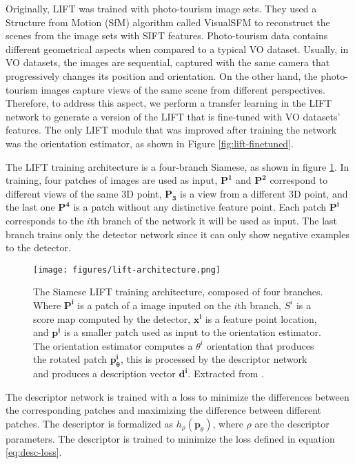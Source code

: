 Originally, LIFT was trained with photo-tourism image sets. They used a Structure from Motion (SfM) algorithm called VisualSFM \cite{visual-sfm} to reconstruct the scenes from the image sets with SIFT features. Photo-tourism data contains different geometrical aspects when compared to a typical VO dataset. Usually, in VO datasets, the images are sequential, captured with the same camera that progressively changes its position and orientation. On the other hand, the photo-tourism images capture views of the same scene from different perspectives. Therefore, to address this aspect, we perform a transfer learning in the LIFT network to generate a version of the LIFT that is fine-tuned with VO datasets' features. The only LIFT module that was improved after training the network was the orientation estimator, as shown in Figure \ref{fig:lift-finetuned}. 

The LIFT training architecture is a four-branch Siamese, as shown in figure \ref{fig:lift-architecture}. In training, four patches of images are used as input, $\mathbf{P^1}$ and $\mathbf{P^2}$ correspond to different views of the same 3D point, $\mathbf{P_3}$ is a view from a different 3D point, and the last one $\mathbf{P^4}$ is a patch without any distinctive feature point. Each patch $\mathbf{P^i}$ corresponds to the $i$th branch of the network it will be used as input. The last branch trains only the detector network since it can only show negative examples to the detector.

\begin{figure}
\centerline{\texttt{[image: figures/lift-architecture.png]}}
\caption[Siamese LIFT training architecture.]{The Siamese LIFT training architecture, composed of four branches. Where $\mathbf{P^i}$ is a patch of a image inputed on the $i$th branch, $S^i$ is a score map computed by the detector, $\mathbf{x^i}$ is a feature point location, and $\mathbf{p^i}$ is a smaller patch used as input to the orientation estimator. The orientation estimator computes a $\theta^i$ orientation that produces the rotated patch $\mathbf{p_{\theta}^i}$, this is processed by the descriptor network and produces a description vector $\mathbf{d^i}$. Extracted from \cite{lift}.}
\label{fig:lift-architecture}
\end{figure}

The descriptor network is trained with a loss to minimize the differences between the corresponding patches and maximizing the difference between different patches. The descriptor is formalized as $h_{\rho}(\mathbf{p}_{\theta})$, where $\rho$ are the descriptor parameters. The descriptor is trained to minimize the loss defined in equation \ref{eq:desc-loss}.

